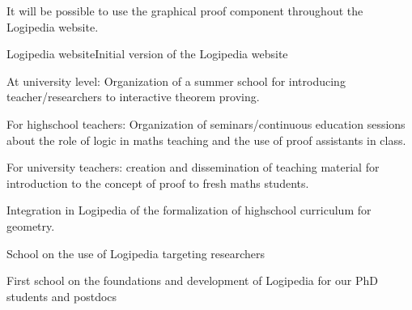 \begin{workpackage}[id=dissemination,wphases=0-48,type=MGT,
  short=Dissemination,%
  title={Dissemination, communication and exploitation},
  lead=Inr]
\begin{tasklist}
\begin{task}[id=edukera,
      title=Web interface for doing proofs at school,
      lead=Edu,EduRM=12]
      It will be possible to use the graphical proof component throughout
      the Logipedia website.
  \end{task}

\end{tasklist}

\begin{wpdelivs}

  
  \begin{wpdeliv}[due=1,miles=startup,id=requirements,dissem=PU,nature=DEC,lead=Inr]{Logipedia website}Initial version of the Logipedia website
  \end{wpdeliv}

  
  \begin{wpdeliv}[due=18,miles=???,id=summerschool,dissem=PU,nature=other,lead=Str]{At university level: Organization of a summer school for introducing teacher/researchers to interactive theorem proving.}
  \end{wpdeliv}

  \begin{wpdeliv}[due=18,miles=???,id=continuoused,dissem=PU,nature=other,lead=Str]{
 For highschool teachers: Organization of seminars/continuous education sessions about the role of logic in maths teaching and the use of proof assistants in class.}
  \end{wpdeliv}

  \begin{wpdeliv}[due=18,miles=???,id=course-proof,dissem=PU,nature=other,lead=Str]{ For university teachers: creation and dissemination of teaching material for introduction to the concept of proof to fresh maths students.}
  \end{wpdeliv}

  \begin{wpdeliv}[due=18,miles=???,id=geom-curriculum,dissem=PU,nature=other,lead=Str]{ Integration in Logipedia of the formalization of highschool curriculum for geometry.}
  \end{wpdeliv}

  \begin{wpdeliv}[due=36,miles=???,id=school-researchers,dissem=PU,nature=other,lead=Bir]{School on the use of Logipedia targeting researchers}
  \end{wpdeliv}

  \begin{wpdeliv}[due=12,miles=???,id=school-first-phd,dissem=PU,nature=other,lead=Bir]{First school on the foundations and development of Logipedia for our PhD students and postdocs}
  \end{wpdeliv}


\end{wpdelivs}
\end{workpackage}
